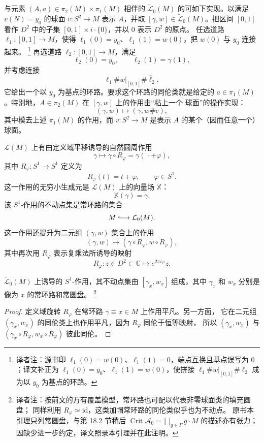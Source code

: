 与元素 $(A,a)\in\pi_2(M)\times\pi_1(M)$ 相伴的
$\widetilde{\mathcal L}_0(M)$ 的\termDeckTransformation{}可如下实现。以满足
$v(N)=y_0$ 的球面 $v:S^2\to M$ 表示 $A$，并取
$[\gamma,w]\in\widetilde{\mathcal L}_0(M)$。把区间 $[0,1]$ 看作
$D^2$ 中的子集 $[0,1]\times i\cdot\{0\}$，并以 $0$ 表示 $D^2$ 的原点。
任选道路 $\ell_1:[0,1]\to M$，使得
$\ell_1(0)=y_0$、$\ell_1(1)=w(0)$，把 $w(0)$ 与 $y_0$ 连接起来。
\footnote{译者注：源书印 $\ell_1(0)=w(0)$、$\ell_1(1)=0$，端点互换且基点误写为
$0$；译文补正为 $\ell_1(0)=y_0$、$\ell_1(1)=w(0)$，使拼接
$\ell_1\#w|_{[0,1]}\#\overline{\ell}_2$ 成为以 $y_0$ 为基点的环路。}
再选道路
$\ell_2:[0,1]\to M$，满足
\[
 \ell_2(0)=y_0,\qquad \ell_2(1)=\gamma(1),
\]
并考虑连接
\[
 \ell_1\#w|_{[0,1]}\#\overline{\ell}_2,
\]
它给出一个以 $y_0$ 为基点的环路。要求这个环路的同伦类就是给定的
$a\in\pi_1(M)$。特别地，$A\in\pi_2(M)$ 在 $[\gamma,w]$ 上的作用由“粘上一个
球面”的操作实现：
\begin{equation}
 (\gamma,w)\longmapsto(\gamma,w\#v),
 \label{eq:18-glue-sphere-action}
\end{equation}
其中模去上述 $\pi_1(M)$ 的作用，而 $v:S^2\to M$ 是表示 $A$ 的某个（因而任意一个）
球面。

$\mathcal L(M)$ 上有由定义域平移诱导的自然圆周作用
\begin{equation}
 \gamma\longmapsto\gamma\circ R_\varphi=\gamma(\,\cdot+\varphi),
 \label{eq:18-loop-rotation}
\end{equation}
其中 $R_\varphi:S^1\to S^1$ 定义为
\[
 R_\varphi(t)=t+\varphi,\qquad\varphi\in S^1.
\]
这一作用的无穷小生成元是 $\mathcal L(M)$ 上的向量场 $\mathbb X$：
\begin{equation}
 \mathbb X(\gamma)=\dot\gamma.
 \label{eq:18-circle-generator}
\end{equation}
该 $S^1$-作用的不动点集是常环路的集合
\[
 M\lhook\joinrel\longrightarrow\mathcal L_0(M).
\]
这一作用还提升为二元组 $(\gamma,w)$ 集合上的作用
\begin{equation}
 (\gamma,w)\longmapsto(\gamma\circ R_\varphi,w\circ R_\varphi),
 \label{eq:18-lifted-circle-action}
\end{equation}
其中再次用 $R_\varphi$ 表示复乘法所诱导的映射
\[
 R_\varphi:z\in D^2\subset\mathbb C\longmapsto e^{2\pi i\varphi}z.
\]

\begin{lemma}
\label{lem:18-fixed-points-lifted-circle}
$\widetilde{\mathcal L}_0(M)$ 上诱导的 $S^1$-作用，其不动点集由
$[\gamma_x,w_x]$ 组成，其中 $\gamma_x$ 和 $w_x$ 分别是像为 $x$ 的常环路和常圆盘。
\footnote{译者注：按前文的万有覆盖模型，常环路也可配以代表非零球面类的填充圆盘；
同样利用 $R_\varphi\simeq\mathrm{id}$，这类加帽常环路的同伦类似乎也为不动点。
原书本引理只列常圆盘，与第 18.2 节稍后
$\operatorname{Crit}\mathcal A_0=\bigsqcup_{g\in\Gamma}g\cdot M$ 的描述亦有张力；
因缺少进一步约定，译文照录本引理并在此注明。}
\end{lemma}

\begin{proof}
定义域旋转 $R_\varphi$ 在常环路 $\gamma\equiv x\in M$ 上作用平凡。另一方面，
它在二元组 $(\gamma_x,w_x)$ 的同伦类上也作用平凡，因为 $R_\varphi$ 同伦于恒等映射，
所以 $(\gamma_x,w_x)$ 与
$(\gamma_x\circ R_\varphi,w_x\circ R_\varphi)$ 彼此同伦。
\end{proof}
